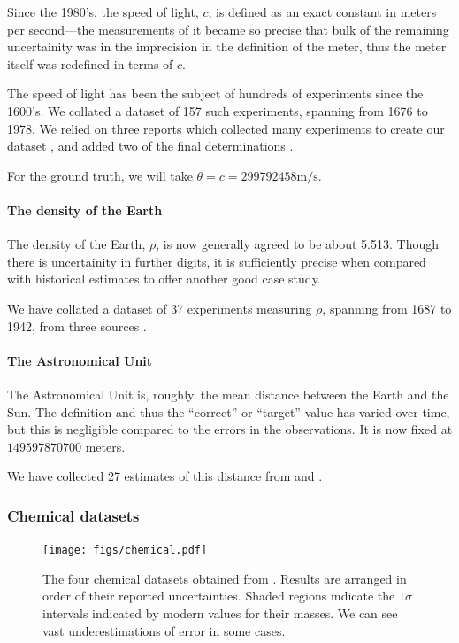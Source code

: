 \documentclass[letterpaper,12pt]{article}
\begin{document}
Since the 1980's, the speed of light, $c$, is defined as an exact constant in meters per second---the measurements of it became so precise that bulk of the remaining uncertainity was in the imprecision in the definition of the meter, thus the meter itself was redefined in terms of $c$.

The speed of light has been the subject of hundreds of experiments since the 1600's. We collated a dataset of 157 such experiments, spanning from 1676 to 1978. We relied on three reports which collected many experiments to create our dataset \citep{birge1934velocity,froome1971velocity,raynaud2013determining}, and added two of the final determinations \citep{evenson1972speed,blaney1974measurement}.

For the ground truth, we will take $\theta=c=299792458\mathrm{m}/\mathrm{s}$.

\paragraph{The density of the Earth}

The density of the Earth, $\rho$, is now generally agreed to be about 5.513. Though there is uncertainity in further digits, it is sufficiently precise when compared with historical estimates to offer another good case study.

We have collated a dataset of 37 experiments measuring $\rho$, spanning from 1687 to 1942, from three sources \citep{burgess1902value,sagitov1970current,hughes2006mean}.

\paragraph{The Astronomical Unit}

The Astronomical Unit is, roughly, the mean distance between the Earth and the Sun. The definition and thus the ``correct'' or ``target'' value has varied over time, but this is negligible compared to the errors in the observations. It is now fixed at $149597870700$ meters.

We have collected 27 estimates of this distance from \citet{atkins1964determination} and \citet{standish2004astronomical}.

\subsubsection{Chemical datasets}

\begin{figure}[htbp]
  \texttt{[image: figs/chemical.pdf]}
  \caption{The four chemical datasets obtained from \citet{clarke1910recalculation}. Results are arranged in order of their reported uncertainties. Shaded regions indicate the $1\sigma$ intervals indicated by modern values for their masses. We can see vast underestimations of error in some cases.}
  \label{fig:chemical}
\end{figure}
\end{document}
